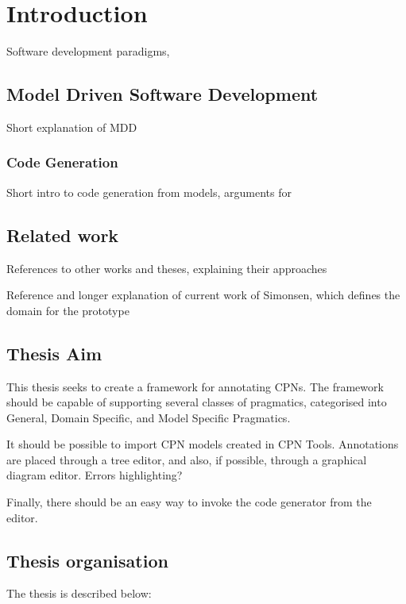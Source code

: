 \chapter{Introduction}
\label{chap:introduction}

Software development paradigms, 

\section{Model Driven Software Development}

Short explanation of MDD

\subsection{Code Generation}

Short intro to code generation from models, arguments for 

\section{Related work}

References to other works and theses, explaining their approaches

Reference and longer explanation of current work of Simonsen, which defines the
domain for the prototype

\section{Thesis Aim}

This thesis seeks to create a framework for annotating CPNs. The framework
should be capable of supporting several classes of pragmatics, 
categorised into General, Domain Specific, and Model Specific Pragmatics.

It should be possible to import CPN models created in CPN Tools. Annotations are
placed through a tree editor, and also, if possible, through a graphical diagram
editor. Errors highlighting?

Finally, there should be an easy way to invoke the code generator from the
editor.

\section{Thesis organisation}

The thesis is described below:

